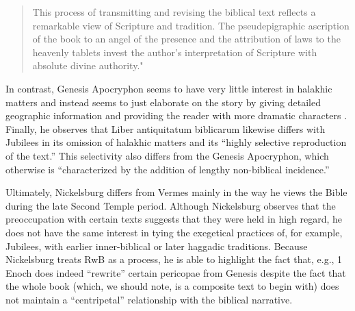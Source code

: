 \begin{quote}
This process of transmitting and revising the biblical text reflects a
remarkable view of Scripture and tradition. The pseudepigraphic
ascription of the book to an angel of the presence and the attribution
of laws to the heavenly tablets invest the author's interpretation of
Scripture with absolute divine
authority."\autocite[101]{nickelsburg_stone1984}
\end{quote}

In contrast, Genesis Apocryphon seems to have very little interest in
halakhic matters and instead seems to just elaborate on the story by
giving detailed geographic information and providing the reader with
more dramatic characters \autocite[106]{nickelsburg_stone1984}. Finally,
he observes that Liber antiquitatum biblicarum likewise differs with
Jubilees in its omission of halakhic matters and its ``highly selective
reproduction of the text.''\autocite[110]{nickelsburg_stone1984} This
selectivity also differs from the Genesis Apocryphon, which otherwise is
``characterized by the addition of lengthy non-biblical
incidence.''\autocite[110]{nickelsburg_stone1984}

Ultimately, Nickelsburg differs from Vermes mainly in the way he views
the Bible during the late Second Temple period. Although Nickelsburg
observes that the preoccupation with certain texts suggests that they
were held in high regard, he does not have the same interest in tying
the exegetical practices of, for example, Jubilees, with earlier
inner-biblical or later haggadic traditions. Because Nickelsburg treats
RwB as a process, he is able to highlight the fact that, e.g., 1 Enoch
does indeed ``rewrite'' certain pericopae from Genesis despite the fact
that the whole book (which, we should note, is a composite text to begin
with) does not maintain a ``centripetal'' relationship with the biblical
narrative.

